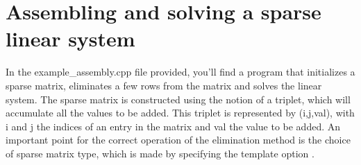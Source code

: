 \documentclass[english,10pt,a4paper]{article}
\begin{document}
\section*{Assembling and solving a sparse linear system}

In the example\_assembly.cpp file provided, you'll find a program that initializes a sparse matrix, eliminates a few rows from the matrix and solves the linear system.
The sparse matrix is constructed using the notion of a triplet, which will accumulate all the values to be added.
This triplet is represented by (i,j,val), with i and j the indices of an entry in the matrix and val the value to be added.
An important point for the correct operation of the elimination method is the choice of sparse matrix type, which is made by specifying the template option .
\end{document}
